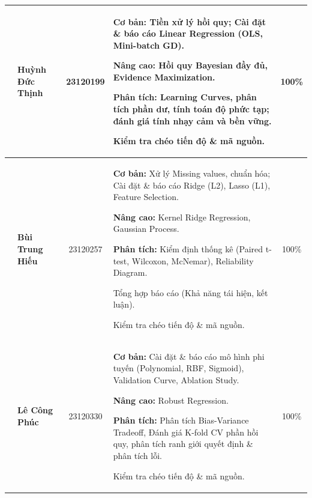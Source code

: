\begin{center}
\begin{tabularx}{\textwidth}{|>{\stepcounter{memberrow}\thememberrow}c|p{3.5cm}|c|X|c|}
        & \textbf{Huỳnh Đức Thịnh} & 23120199 & 
        \begin{tableitemize}
            \item \textbf{Cơ bản:} Tiền xử lý hồi quy; Cài đặt \& báo cáo Linear Regression (OLS, Mini-batch GD).
            \item \textbf{Nâng cao:} Hồi quy Bayesian đầy đủ, Evidence Maximization.
            \item \textbf{Phân tích:} Learning Curves, phân tích phần dư, tính toán độ phức tạp; đánh giá tính nhạy cảm và bền vững.
            \item Kiểm tra chéo tiến độ \& mã nguồn.
        \end{tableitemize} & 100\% \\ \hline
        
        & \textbf{Bùi Trung Hiếu} & 23120257 & 
        \begin{tableitemize}
            \item \textbf{Cơ bản:} Xử lý Missing values, chuẩn hóa; Cài đặt \& báo cáo Ridge (L2), Lasso (L1), Feature Selection.
            \item \textbf{Nâng cao:} Kernel Ridge Regression, Gaussian Process.
            \item \textbf{Phân tích:} Kiểm định thống kê (Paired t-test, Wilcoxon, McNemar), Reliability Diagram.
            \item Tổng hợp báo cáo (Khả năng tái hiện, kết luận).
            \item Kiểm tra chéo tiến độ \& mã nguồn.
        \end{tableitemize} & 100\% \\ \hline
        
        & \textbf{Lê Công Phúc} & 23120330 & 
        \begin{tableitemize}
            \item \textbf{Cơ bản:} Cài đặt \& báo cáo mô hình phi tuyến (Polynomial, RBF, Sigmoid), Validation Curve, Ablation Study.
            \item \textbf{Nâng cao:} Robust Regression.
            \item \textbf{Phân tích:} Phân tích Bias-Variance Tradeoff, Đánh giá K-fold CV phần hồi quy, phân tích ranh giới quyết định \& phân tích lỗi.
            \item Kiểm tra chéo tiến độ \& mã nguồn.
        \end{tableitemize} & 100\% \\ \hline
        
    \end{tabularx}
\end{center}

\clearpage